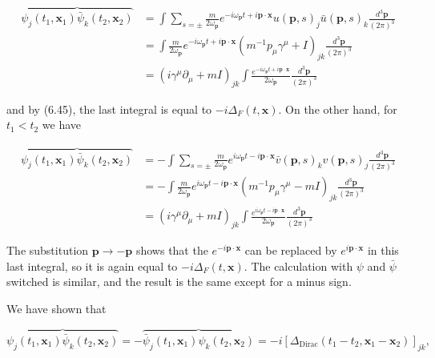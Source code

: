 \documentclass[10pt, letterpaper]{article}
\begin{document}
$$
\begin{aligned}
\overbrace{\psi_{j}\left(t_{1}, \mathbf{x}_{1}\right) \bar{\psi}_{k}\left(t_{2}, \mathbf{x}_{2}\right)} & =\int \sum_{s= \pm} \frac{m}{2 \omega_{\mathbf{p}}} e^{-i \omega_{\mathbf{p}} t+i \mathbf{p} \cdot \mathbf{x}} u(\mathbf{p}, s)_{j} \bar{u}(\mathbf{p}, s)_{k} \frac{d^{3} \mathbf{p}}{(2 \pi)^{3}} \\
& =\int \frac{m}{2 \omega_{\mathbf{p}}} e^{-i \omega_{\mathbf{p}} t+i \mathbf{p} \cdot \mathbf{x}}\left(m^{-1} p_{\mu} \gamma^{\mu}+I\right)_{j k} \frac{d^{3} \mathbf{p}}{(2 \pi)^{3}} \\
& =\left(i \gamma^{\mu} \partial_{\mu}+m I\right)_{j k} \int \frac{e^{-i \omega_{\mathbf{p}} t+i \mathbf{p} \cdot \mathbf{x}}}{2 \omega_{\mathbf{p}}} \frac{d^{3} \mathbf{p}}{(2 \pi)^{3}}
\end{aligned}
$$

and by (6.45), the last integral is equal to $-i \Delta_{F}(t, \mathbf{x})$. On the other hand, for $t_{1}<t_{2}$ we have

$$
\begin{aligned}
\overbrace{\psi_{j}\left(t_{1}, \mathbf{x}_{1}\right) \bar{\psi}_{k}\left(t_{2}, \mathbf{x}_{2}\right)} & =-\int \sum_{s= \pm} \frac{m}{2 \omega_{\mathbf{p}}} e^{i \omega_{\mathbf{p}} t-i \mathbf{p} \cdot \mathbf{x}} \bar{v}(\mathbf{p}, s)_{k} v(\mathbf{p}, s)_{j} \frac{d^{3} \mathbf{p}}{(2 \pi)^{3}} \\
& =-\int \frac{m}{2 \omega_{\mathbf{p}}} e^{i \omega_{\mathbf{p}} t-i \mathbf{p} \cdot \mathbf{x}}\left(m^{-1} p_{\mu} \gamma^{\mu}-m I\right)_{j k} \frac{d^{3} \mathbf{p}}{(2 \pi)^{3}} \\
& =\left(i \gamma^{\mu} \partial_{\mu}+m I\right)_{j k} \int \frac{e^{i \omega_{\mathbf{p}} t-i \mathbf{p} \cdot \mathbf{x}}}{2 \omega_{\mathbf{p}}} \frac{d^{3} \mathbf{p}}{(2 \pi)^{3}}
\end{aligned}
$$

The substitution $\mathbf{p} \rightarrow-\mathbf{p}$ shows that the $e^{-i \mathbf{p} \cdot \mathbf{x}}$ can be replaced by $e^{i \mathbf{p} \cdot \mathbf{x}}$ in this last integral, so it is again equal to $-i \Delta_{F}(t, \mathbf{x})$. The calculation with $\psi$ and $\bar{\psi}$ switched is similar, and the result is the same except for a minus sign.

We have shown that

$$
\overbrace{\psi_{j}\left(t_{1}, \mathbf{x}_{1}\right) \bar{\psi}_{k}\left(t_{2}, \mathbf{x}_{2}\right)}=-\overbrace{\bar{\psi}_{j}\left(t_{1}, \mathbf{x}_{1}\right) \psi_{k}\left(t_{2}, \mathbf{x}_{2}\right)}=-i\left[\Delta_{\mathrm{Dirac}}\left(t_{1}-t_{2}, \mathbf{x}_{1}-\mathbf{x}_{2}\right)\right]_{j k},
$$
\end{document}
